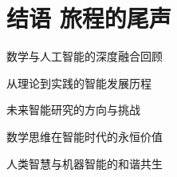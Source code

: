 \chapter*{ 结语 旅程的尾声}
 \begin{introduction}
  \item 数学与人工智能的深度融合回顾
  \item 从理论到实践的智能发展历程
  \item 未来智能研究的方向与挑战
  \item 数学思维在智能时代的永恒价值
  \item 人类智慧与机器智能的和谐共生
\end{introduction}


